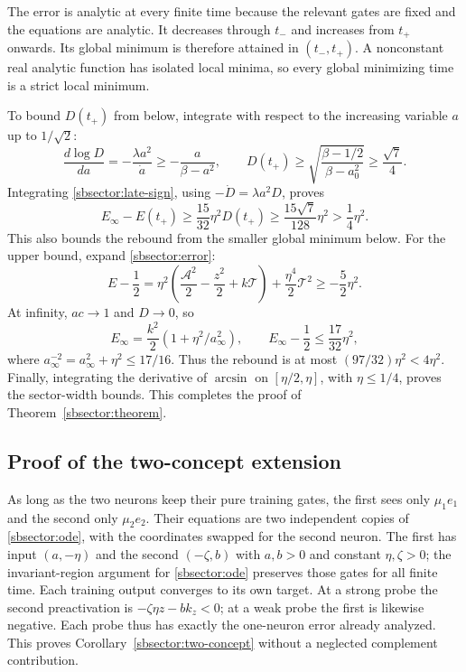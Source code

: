 \documentclass[10pt]{article}
\theoremstyle{remark}\newtheorem{remark}[theorem]{Remark}
\begin{document}
The error is analytic at every finite time because the relevant gates
are fixed and the equations are analytic. It decreases through $t_-$
and increases from $t_+$ onwards. Its global minimum is therefore attained
in $(t_-,t_+)$. A nonconstant real analytic function has isolated local
minima, so every global minimizing time is a strict local minimum.

To bound $D(t_+)$ from below, integrate with respect to the increasing
variable $a$ up to $1/\sqrt2$:
\[
 \frac{d\log D}{da}=-\frac{\lambda a^2}{\dot a}
 \ge-\frac{a}{\beta-a^2},
 \qquad
 D(t_+)\ge
 \sqrt{\frac{\beta-1/2}{\beta-a_0^2}}
 \ge\frac{\sqrt7}{4}.
\]
Integrating \eqref{sbsector:late-sign}, using
$-\dot D=\lambda a^2D$, proves
\[
 E_\infty-E(t_+)
 \ge\frac{15}{32}\eta^2D(t_+)
 \ge\frac{15\sqrt7}{128}\eta^2>\frac14\eta^2.
\]
This also bounds the rebound from the smaller global minimum below.
For the upper bound, expand \eqref{sbsector:error}:
\[
 E-\frac12
 =\eta^2\left(\frac{\mathcal A^2}{2}-\frac{z^2}{2}
                         +k\mathcal T\right)
   +\frac{\eta^4}{2}\mathcal T^2\ge-\frac52\eta^2.
\]
At infinity, $ac\to1$ and $D\to0$, so
\[
 E_\infty=\frac{k^2}{2}(1+\eta^2/a_\infty^2),
 \qquad
 E_\infty-\frac12\le\frac{17}{32}\eta^2,
\]
where $a_\infty^{-2}=a_\infty^2+\eta^2\le17/16$.
Thus the rebound is at most $(97/32)\eta^2<4\eta^2$.
Finally, integrating the derivative of $\arcsin$ on
$[\eta/2,\eta]$, with $\eta\le1/4$, proves the sector-width bounds.
This completes the proof of Theorem~\ref{sbsector:theorem}.

\subsection{Proof of the two-concept extension}
As long as the two neurons keep their pure training gates, the first
sees only $\mu_1e_1$ and the second only $\mu_2e_2$. Their equations
are two independent copies of \eqref{sbsector:ode}, with the coordinates
swapped for the second neuron. The first has input $(a,-\eta)$ and
the second $(-\zeta,b)$ with $a,b>0$ and constant $\eta,\zeta>0$;
the invariant-region argument for \eqref{sbsector:ode} preserves those gates
for all finite time. Each training output converges to its own target.
At a strong probe the second preactivation is
$-\zeta\eta z-bk_z<0$; at a weak probe the first is likewise negative.
Each probe thus has exactly the one-neuron error already analyzed.
This proves Corollary~\ref{sbsector:two-concept} without a neglected
complement contribution.
\end{document}
